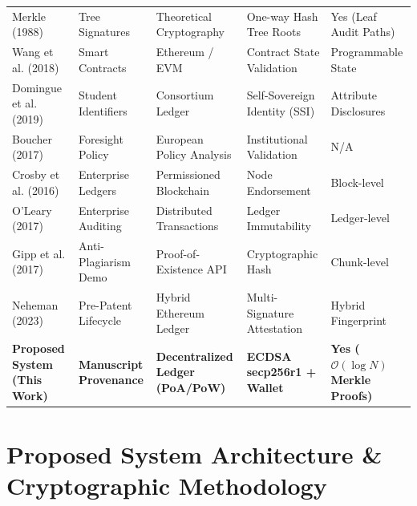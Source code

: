 \documentclass[conference]{IEEEtran}
\begin{document}
\begin{table}[t]
\begin{tabular}{@{}lllll@{}}
Merkle \cite{merkle1987signature} (1988) & Tree Signatures & Theoretical Cryptography & One-way Hash Tree Roots & Yes (Leaf Audit Paths) \\
Wang et al. \cite{wang2018smartcontracts} (2018) & Smart Contracts & Ethereum / EVM & Contract State Validation & Programmable State \\
Domingue et al. \cite{domingue2019credentials} (2019) & Student Identifiers & Consortium Ledger & Self-Sovereign Identity (SSI) & Attribute Disclosures \\
Boucher \cite{boucher2017blockchain} (2017) & Foresight Policy & European Policy Analysis & Institutional Validation & N/A \\
Crosby et al. \cite{crosby2016beyondbitcoin} (2016) & Enterprise Ledgers & Permissioned Blockchain & Node Endorsement & Block-level \\
O'Leary \cite{oleary2017openinformation} (2017) & Enterprise Auditing & Distributed Transactions & Ledger Immutability & Ledger-level \\
Gipp et al. \cite{gipp2017antiplagiarism} (2017) & Anti-Plagiarism Demo & Proof-of-Existence API & Cryptographic Hash & Chunk-level \\
Neheman \cite{neheman2023provenance} (2023) & Pre-Patent Lifecycle & Hybrid Ethereum Ledger & Multi-Signature Attestation & Hybrid Fingerprint \\ \midrule
\textbf{Proposed System (This Work)} & \textbf{Manuscript Provenance} & \textbf{Decentralized Ledger (PoA/PoW)} & \textbf{ECDSA secp256r1 + Wallet} & \textbf{Yes ($\mathcal{O}(\log N)$ Merkle Proofs)} \\ \bottomrule
\end{tabular}
\end{table}

\section{Proposed System Architecture \& Cryptographic Methodology}
\end{document}
